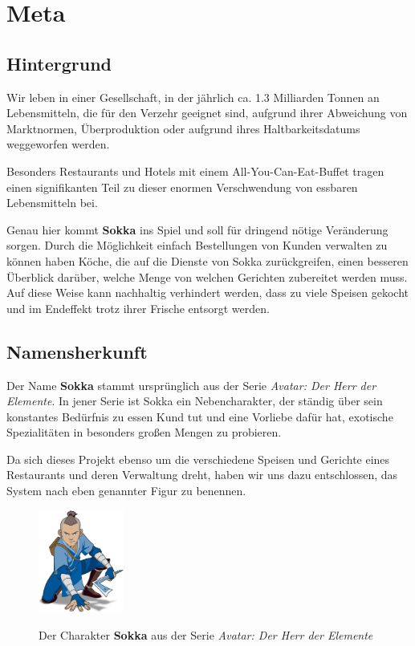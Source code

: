 \chapter{Meta}

\section{Hintergrund}

Wir leben in einer Gesellschaft, in der jährlich ca. 1.3 Milliarden Tonnen an Lebensmitteln, die für den Verzehr geeignet sind, aufgrund ihrer Abweichung von Marktnormen, Überproduktion oder aufgrund ihres Haltbarkeitsdatums weggeworfen werden.

Besonders Restaurants und Hotels mit einem All-You-Can-Eat-Buffet tragen einen signifikanten Teil zu dieser enormen Verschwendung von essbaren Lebensmitteln bei.

Genau hier kommt \textbf{Sokka} ins Spiel und soll für dringend nötige Veränderung sorgen. Durch die Möglichkeit einfach Bestellungen von Kunden verwalten zu können haben Köche, die auf die Dienste von Sokka zurückgreifen, einen besseren Überblick darüber, welche Menge von welchen Gerichten zubereitet werden muss.\\
Auf diese Weise kann nachhaltig verhindert werden, dass zu viele Speisen gekocht und im Endeffekt trotz ihrer Frische entsorgt werden.

\section{Namensherkunft}

Der Name \textbf{Sokka} stammt ursprünglich aus der Serie \textit{Avatar: Der Herr der Elemente}. In jener Serie ist Sokka ein Nebencharakter, der ständig über sein konstantes Bedürfnis zu essen Kund tut und eine Vorliebe dafür hat, exotische Spezialitäten in besonders großen Mengen zu probieren.

Da sich dieses Projekt ebenso um die verschiedene Speisen und Gerichte eines Restaurants und deren Verwaltung dreht, haben wir uns dazu entschlossen, das System nach eben genannter Figur zu benennen.

\begin{figure}[H]
    \begin{center}
        \includegraphics[width=0.25\textwidth]{images/Intro/Sokka.png}
        \caption{Der Charakter \textbf{Sokka} aus der Serie \textit{Avatar: Der Herr der Elemente}}
        \cite{nickelodeon2005}
    \end{center}
\end{figure}


